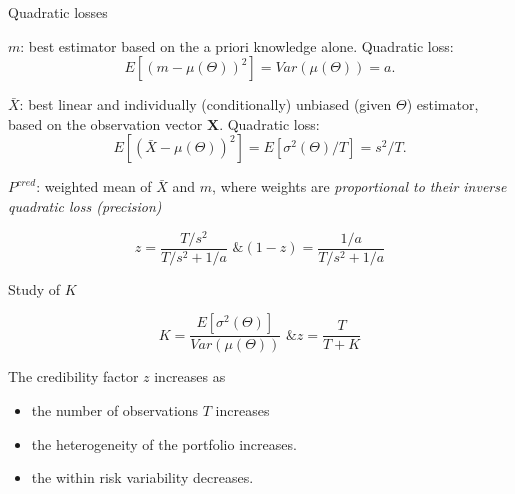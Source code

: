 \documentclass[11pt]{beamer}
\begin{document}
\begin{frame}{Quadratic losses}

\alert{$m$}: best estimator based on the a priori knowledge alone. Quadratic loss:
$$E[(m-\mu(\Theta))^2]=Var(\mu(\Theta))=a.$$

\alert{$\bar{X}$}: best linear and individually (conditionally) unbiased (given $\Theta$) estimator, based on the observation vector $\mathbf{X}$. Quadratic loss:
$$E[(\bar{X}-\mu(\Theta))^2]=E[\sigma^2(\Theta)/T]=s^2/T.$$

\alert{$P^{cred}$}: weighted mean of $\bar{X}$ and $m$, where weights are \emph{proportional to their inverse quadratic loss (precision)}

$$ z = \frac{T/s^2}{T/s^2+1/a} \text{  \&  } (1-z)=\frac{1/a}{T/s^2+1/a} $$



\end{frame}
\begin{frame}[t]{Study of $K$}

$$K=\frac{E[\sigma^2(\Theta)]}{Var(\mu(\Theta))} \text{  \&  } z=\frac{T}{T+K} $$

\vfill

The credibility factor $z$ increases as
\vfill
\begin{itemize}
\item the number of observations $T$ increases
\vfill
\item the heterogeneity of the portfolio increases.
\vfill
\item the within risk variability decreases.
\end{itemize}


\end{frame}
\end{document}

